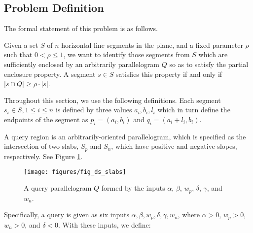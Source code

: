 \subsection{Problem Definition}
\label{:slabs:two:problem}

The formal statement of this problem is as follows.

\begin{problem}
Given a set $S$ of $n$ horizontal line segments in the plane, and a fixed parameter $\rho$ such that $0 < \rho \leq 1$, we want to identify those segments from $S$ which are sufficiently enclosed by an arbitrarily parallelogram $Q$ so as to satisfy the partial enclosure property.
A segment $s \in S$ satisfies this property if and only if $|s \cap Q| \geq \rho \cdot |s|$.
\end{problem}

Throughout this section, we use the following definitions. Each segment $s_i \in S, 1 \leq i \leq n$ is defined by three values $a_i, b_i, l_i$ which in turn define the endpoints of the segment as $p_i = (a_i, b_i)$ and $q_i = (a_i + l_i, b_i)$.

A query region is an arbitrarily-oriented parallelogram, which is specified as the intersection of two slabs, $S_p$ and $S_n$, which have positive and negative slopes, respectively. See Figure \ref{fig:slabs:two:ds}.

\begin{figure}[t]
\begin{center}
  \texttt{[image: figures/fig\_ds\_slabs]}
  \caption{A query parallelogram $Q$ formed by the inputs $\alpha$, $\beta$, $w_p$,
  $\delta$, $\gamma$, and $w_n$.}
  \label{fig:slabs:two:ds}
\end{center}
\end{figure}

Specifically, a query is given as six inputs $\alpha, \beta, w_p, \delta, \gamma, w_n$, where $\alpha > 0$, $w_p > 0$, $w_n > 0$, and $\delta < 0$. With these inputs, we define:

